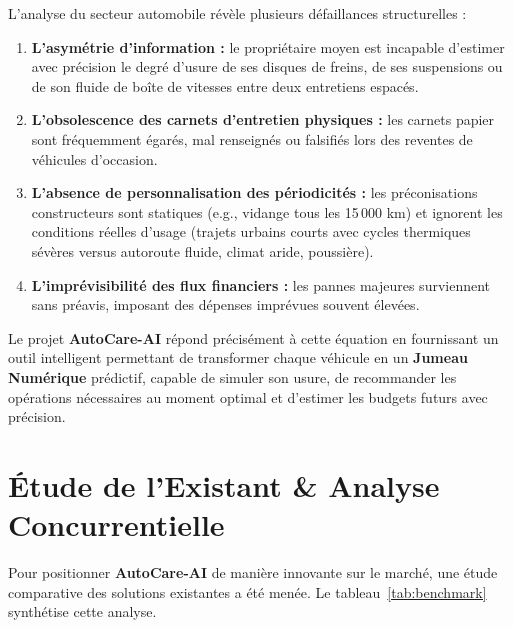 \documentclass[12pt,a4paper,twoside,openright]{report}
\begin{document}
  L'analyse du secteur automobile r\'ev\`ele plusieurs d\'efaillances structurelles :
  \begin{enumerate}
    \item \textbf{L'asym\'etrie d'information :} le propri\'etaire moyen est incapable d'estimer avec pr\'ecision le degr\'e d'usure de ses disques de freins, de ses suspensions ou de son fluide de bo\^ite de vitesses entre deux entretiens espac\'es.
    \item \textbf{L'obsolescence des carnets d'entretien physiques :} les carnets papier sont fr\'equemment \'egar\'es, mal renseign\'es ou falsifi\'es lors des reventes de v\'ehicules d'occasion.
    \item \textbf{L'absence de personnalisation des p\'eriodicit\'es :} les pr\'econisations constructeurs sont statiques (e.g., vidange tous les 15\,000 km) et ignorent les conditions r\'eelles d'usage (trajets urbains courts avec cycles thermiques s\'ev\`eres versus autoroute fluide, climat aride, poussi\`ere).
    \item \textbf{L'impr\'evisibilit\'e des flux financiers :} les pannes majeures surviennent sans pr\'eavis, imposant des d\'epenses impr\'evues souvent \'elev\'ees.
  \end{enumerate}

  Le projet \textbf{AutoCare-AI} r\'epond pr\'ecis\'ement \`a cette \'equation en fournissant un outil intelligent permettant de transformer chaque v\'ehicule en un \textbf{Jumeau Num\'erique} pr\'edictif, capable de simuler son usure, de recommander les op\'erations n\'ecessaires au moment optimal et d'estimer les budgets futurs avec pr\'ecision.

  \section{\'Etude de l'Existant \& Analyse Concurrentielle}
  Pour positionner \textbf{AutoCare-AI} de mani\`ere innovante sur le march\'e, une \'etude comparative des solutions existantes a \'et\'e men\'ee. Le tableau~\ref{tab:benchmark} synth\'etise cette analyse.
\end{document}
